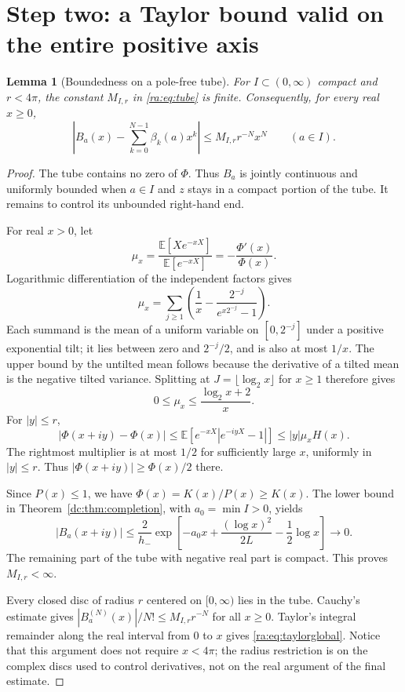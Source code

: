 \documentclass[11pt,a4paper,oneside,openany]{book}
\numberwithin{equation}{chapter}
\newtheorem{lemma}[theorem]{Lemma}
\theoremstyle{definition}
\theoremstyle{remark}
\newcommand{\E}{\mathbb E}
\newcommand{\W}{K}
\begin{document}
\section{Step two: a Taylor bound valid on the entire positive axis}
\begin{lemma}[Boundedness on a pole-free tube]\label{ra:lem:tubebound}
For $I\subset(0,\infty)$ compact and $r<4\pi$, the constant $M_{I,r}$ in
\eqref{ra:eq:tube} is finite. Consequently, for every real $x\ge0$,
\begin{equation}\label{ra:eq:taylorglobal}
 \left|B_a(x)-\sum_{k=0}^{N-1}\beta_k(a)x^k\right|
  \le M_{I,r}r^{-N}x^N\qquad(a\in I).
\end{equation}
\end{lemma}
\begin{proof}
The tube contains no zero of $\Phi$. Thus $B_a$ is jointly continuous and
uniformly bounded when $a\in I$ and $z$ stays in a compact portion of the
tube. It remains to control its unbounded right-hand end.

For real $x>0$, let
\[
 \mu_x=\frac{\E[Xe^{-xX}]}{\E[e^{-xX}]}=-\frac{\Phi'(x)}{\Phi(x)}.
\]
Logarithmic differentiation of the independent factors gives
\begin{equation}\label{ra:eq:tiltedmean}
 \mu_x=\sum_{j\ge1}
 \left(\frac1x-\frac{2^{-j}}{e^{x2^{-j}}-1}\right).
\end{equation}
Each summand is the mean of a uniform variable on $[0,2^{-j}]$ under a
positive exponential tilt; it lies between zero and $2^{-j}/2$, and is
also at most $1/x$. The upper bound by the untilted mean follows because
the derivative of a tilted mean is the negative tilted variance. Splitting at $J=\lfloor\log_2x\rfloor$ for $x\ge1$
therefore gives
\begin{equation}\label{ra:eq:tiltedbound}
 0\le\mu_x\le\frac{\log_2x+2}{x}.
\end{equation}
For $|y|\le r$,
\[
 |\Phi(x+iy)-\Phi(x)|
 \le\E[e^{-xX}|e^{-iyX}-1|]
 \le |y|\mu_xH(x).
\]
The rightmost multiplier is at most $1/2$ for sufficiently large $x$,
uniformly in $|y|\le r$. Thus $|\Phi(x+iy)|\ge \Phi(x)/2$ there.

Since $P(x)\le1$, we have $\Phi(x)=\W(x)/P(x)\ge\W(x)$.
The lower bound in Theorem~\ref{dc:thm:completion}, with $a_0=\min I>0$, yields
\[
 |B_a(x+iy)|\le\frac{2}{h_-}
 \exp\!\left[-a_0x+\frac{(\log x)^2}{2L}
                   -\frac12\log x\right]\longrightarrow0.
\]
The remaining part of the tube with negative real part is compact. This
proves $M_{I,r}<\infty$.

Every closed disc of radius $r$ centered on $[0,\infty)$ lies in the tube.
Cauchy's estimate gives
$|B_a^{(N)}(x)|/N!\le M_{I,r}r^{-N}$ for all $x\ge0$.
Taylor's integral remainder along the real interval from $0$ to $x$ gives
\eqref{ra:eq:taylorglobal}. Notice that this argument does not require
$x<4\pi$; the radius restriction is on the complex discs used to control
derivatives, not on the real argument of the final estimate.
\end{proof}
\end{document}
